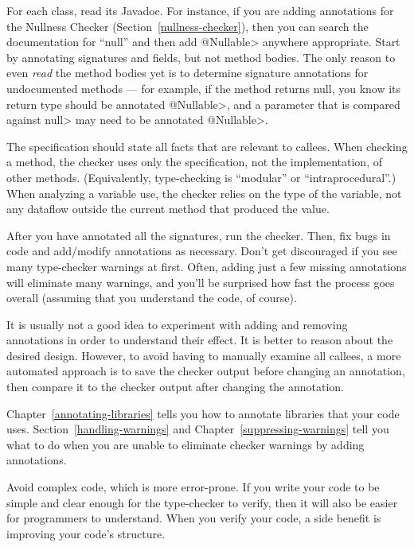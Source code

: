For each class, read its Javadoc.  For instance, if you are adding
annotations for the Nullness Checker (Section~\ref{nullness-checker}), then
you can search the documentation for ``null'' and then add \<@Nullable>
anywhere appropriate.  Start by annotating signatures and fields, but not
method bodies.  The only reason to even
\emph{read} the method bodies yet is to determine signature annotations for
undocumented methods ---
for example, if the method returns null, you know its return type should be
annotated \<@Nullable>, and a parameter that is compared against \<null>
may need to be annotated \<@Nullable>.

The specification should state all facts that are relevant to callees.
When checking a method, the checker uses only the specification, not the
implementation, of other methods.  (Equivalently, type-checking is
``modular'' or ``intraprocedural''.)  When analyzing a variable use, the
checker relies on the type of the variable, not any dataflow outside the
current method that produced the value.

After you have annotated all the signatures, run the checker.
Then, fix bugs in code and add/modify annotations as necessary.
Don't get discouraged if you see many type-checker warnings at first.
Often, adding just a few missing annotations will eliminate many warnings,
and you'll be surprised how fast the process goes overall (assuming that
you understand the code, of course).

It is usually not a good idea to experiment with adding and removing
annotations in order to understand their effect.  It is better to reason
about the desired design.  However, to avoid having to manually examine all
callees, a more automated approach is to save the checker output before
changing an annotation, then compare it to the checker output after
changing the annotation.

Chapter~\ref{annotating-libraries} tells you how to annotate libraries that
your code uses.  Section~\ref{handling-warnings} and
Chapter~\ref{suppressing-warnings} tell you what to do when you are unable
to eliminate checker warnings by adding annotations.



Avoid complex code, which is more error-prone.  If you write your code to
be simple and clear enough for the type-checker to verify, then it will
also be easier for programmers to understand.  When you verify your code, a
side benefit is improving your code's structure.

